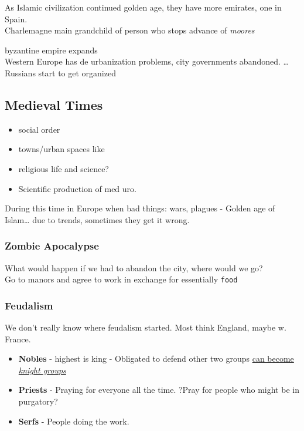 \documentclass[11pt]{article}
\begin{document}
As Islamic civilization continued golden age, they have more emirates, one in Spain.\\
Charlemagne main grandchild of person who stops advance of \emph{moores} 

byzantine empire expands\\
Western Europe has de urbanization problems, city governments abandoned.
\ldots{} Russians start to get organized

\subsection{Medieval Times}
\label{sec-7-4}
\begin{itemize}
\item social order\\
\item towns/urban spaces like\\
\item religious life and science?\\
\item Scientific production of med uro.
\end{itemize}

During this time in Europe when bad things: wars, plagues - Golden age of Islam\ldots{}
due to trends, sometimes they get it wrong.\\
\subsubsection{Zombie Apocalypse}
\label{sec-7-4-1}
What would happen if we had to abandon the city, where would we go? \\
Go to manors and agree to work in exchange for essentially \texttt{food}

\subsubsection{Feudalism}
\label{sec-7-4-2}
We don't really know where feudalism started. Most think England, maybe w. France.
\begin{itemize}
\item \textbf{Nobles} - highest is king - Obligated to defend other two groups \uline{can become \emph{knight groups}} \\
\item \textbf{Priests} - Praying for everyone all the time. ?Pray for people who might be in purgatory?
\item \textbf{Serfs} - People doing the work.
\end{itemize}
\end{document}
